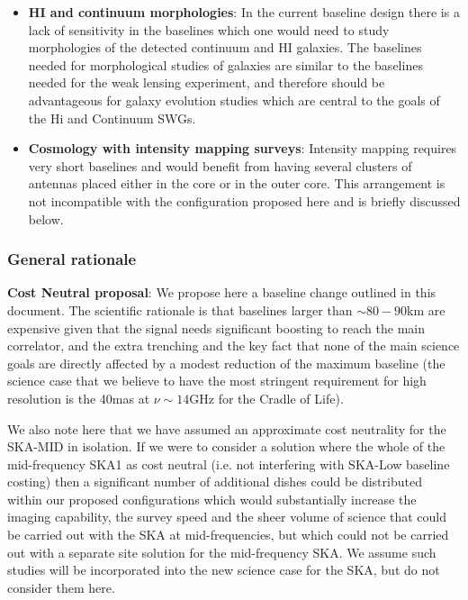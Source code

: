 \documentclass[sfheadings,a4paper,times,9pt,floats,floatfix]{article}
\begin{document}
\begin{itemize}
\item {\bf HI and continuum morphologies}: In the current baseline design there is a lack of sensitivity
in the baselines which one would need to study morphologies of the detected continuum
and HI galaxies. The baselines needed for morphological studies of galaxies
are similar to the baselines needed for the weak lensing experiment, and therefore should be advantageous for galaxy
evolution studies which are central to the goals of the H{\sc i} and
Continuum SWGs.

\item {\bf Cosmology with intensity mapping surveys}: Intensity mapping requires very short baselines
and would benefit from having several clusters of antennas placed either in the core or in
the outer core. This arrangement is not incompatible with the configuration
proposed here and is briefly discussed below.
\end{itemize}
\subsubsection{General rationale}

{\bf Cost Neutral proposal}: We propose here a baseline change outlined in this document. The scientific rationale is that
baselines larger than $\sim 80-90$km are expensive given that the signal needs significant boosting to
reach the main correlator, and the extra trenching and the key fact
that none of the main science goals are directly
affected by a modest reduction of the maximum baseline (the 
science case that we believe to have the most stringent requirement
for high resolution is the 40mas at $\nu\sim 14$GHz for the Cradle of Life). 

We also note here that we have assumed an approximate cost neutrality
for the SKA-MID in isolation. If we were to consider a solution where the whole of the
mid-frequency SKA1 as cost neutral (i.e. not interfering with
SKA-Low baseline costing) then a significant number of additional dishes could be distributed
within our proposed configurations which would substantially increase the imaging
capability, the survey speed and the sheer volume of science that
could be carried out with the SKA at mid-frequencies, but which could
not be carried out with a separate site solution for the mid-frequency SKA. We
assume such studies will be incorporated into the new science case for
the SKA, but do not consider them here.
\end{document}
